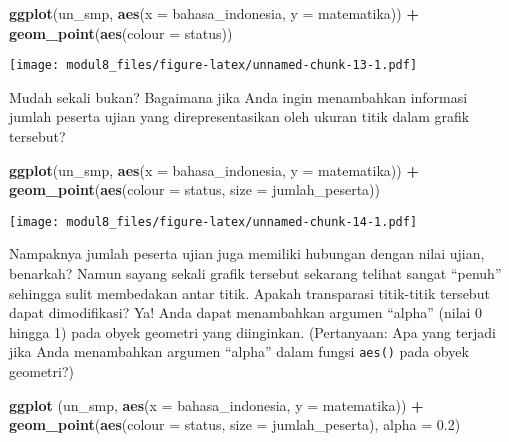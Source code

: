 \documentclass[
]{article}
\newenvironment{Shaded}{\begin{snugshade}}{\end{snugshade}}
\newcommand{\DataTypeTok}[1]{\textcolor[rgb]{0.13,0.29,0.53}{#1}}
\newcommand{\FloatTok}[1]{\textcolor[rgb]{0.00,0.00,0.81}{#1}}
\newcommand{\KeywordTok}[1]{\textcolor[rgb]{0.13,0.29,0.53}{\textbf{#1}}}
\newcommand{\NormalTok}[1]{#1}
\newcommand{\OperatorTok}[1]{\textcolor[rgb]{0.81,0.36,0.00}{\textbf{#1}}}
\begin{document}
\begin{Shaded}
\begin{Highlighting}[]
\KeywordTok{ggplot}\NormalTok{(un_smp, }\KeywordTok{aes}\NormalTok{(}\DataTypeTok{x =}\NormalTok{ bahasa_indonesia, }\DataTypeTok{y =}\NormalTok{ matematika)) }\OperatorTok{+}
\KeywordTok{geom_point}\NormalTok{(}\KeywordTok{aes}\NormalTok{(}\DataTypeTok{colour =}\NormalTok{ status))}
\end{Highlighting}
\end{Shaded}

\texttt{[image: modul8\_files/figure-latex/unnamed-chunk-13-1.pdf]}

Mudah sekali bukan? Bagaimana jika Anda ingin menambahkan informasi
jumlah peserta ujian yang direpresentasikan oleh ukuran titik dalam
grafik tersebut?

\begin{Shaded}
\begin{Highlighting}[]
\KeywordTok{ggplot}\NormalTok{(un_smp, }\KeywordTok{aes}\NormalTok{(}\DataTypeTok{x =}\NormalTok{ bahasa_indonesia, }\DataTypeTok{y =}\NormalTok{ matematika)) }\OperatorTok{+}
\KeywordTok{geom_point}\NormalTok{(}\KeywordTok{aes}\NormalTok{(}\DataTypeTok{colour =}\NormalTok{ status, }\DataTypeTok{size =}\NormalTok{ jumlah_peserta))}
\end{Highlighting}
\end{Shaded}

\texttt{[image: modul8\_files/figure-latex/unnamed-chunk-14-1.pdf]}

Nampaknya jumlah peserta ujian juga memiliki hubungan dengan nilai
ujian, benarkah? Namun sayang sekali grafik tersebut sekarang telihat
sangat ``penuh'' sehingga sulit membedakan antar titik. Apakah
transparasi titik-titik tersebut dapat dimodifikasi? Ya! Anda dapat
menambahkan argumen ``alpha'' (nilai 0 hingga 1) pada obyek geometri
yang diinginkan. (Pertanyaan: Apa yang terjadi jika Anda menambahkan
argumen ``alpha'' dalam fungsi \texttt{aes()} pada obyek geometri?)

\begin{Shaded}
\begin{Highlighting}[]
\KeywordTok{ggplot}\NormalTok{ (un_smp, }\KeywordTok{aes}\NormalTok{(}\DataTypeTok{x =}\NormalTok{ bahasa_indonesia, }\DataTypeTok{y =}\NormalTok{ matematika)) }\OperatorTok{+}
\KeywordTok{geom_point}\NormalTok{(}\KeywordTok{aes}\NormalTok{(}\DataTypeTok{colour =}\NormalTok{ status, }\DataTypeTok{size =}\NormalTok{ jumlah_peserta), }\DataTypeTok{alpha =} \FloatTok{0.2}\NormalTok{)}
\end{Highlighting}
\end{Shaded}
\end{document}
